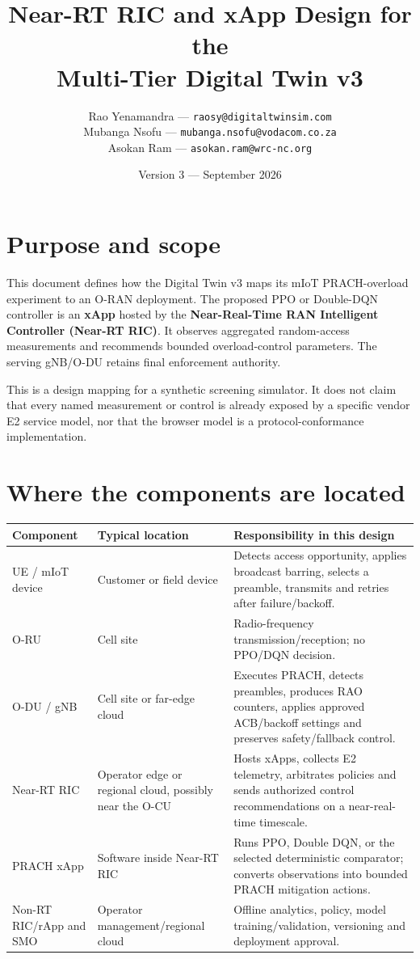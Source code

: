 \documentclass[10pt]{article}
\title{Near-RT RIC and xApp Design for the\\Multi-Tier Digital Twin v3}
\author{Rao Yenamandra --- \texttt{raosy@digitaltwinsim.com}\\
Mubanga Nsofu --- \texttt{mubanga.nsofu@vodacom.co.za}\\
Asokan Ram --- \texttt{asokan.ram@wrc-nc.org}}
\date{Version 3 --- September 2026}
\begin{document}
\maketitle

\section{Purpose and scope}
This document defines how the Digital Twin v3 maps its mIoT PRACH-overload experiment to an O-RAN deployment. The proposed PPO or Double-DQN controller is an \textbf{xApp} hosted by the \textbf{Near-Real-Time RAN Intelligent Controller (Near-RT RIC)}. It observes aggregated random-access measurements and recommends bounded overload-control parameters. The serving gNB/O-DU retains final enforcement authority.

This is a design mapping for a synthetic screening simulator. It does not claim that every named measurement or control is already exposed by a specific vendor E2 service model, nor that the browser model is a protocol-conformance implementation.

\section{Where the components are located}
\begin{tabular}{>{\raggedright\arraybackslash}p{}>{\raggedright\arraybackslash}p{}>{\raggedright\arraybackslash}p{}}
\toprule Component & Typical location & Responsibility in this design\\\midrule
UE / mIoT device & Customer or field device & Detects access opportunity, applies broadcast barring, selects a preamble, transmits and retries after failure/backoff.\\
O-RU & Cell site & Radio-frequency transmission/reception; no PPO/DQN decision.\\
O-DU / gNB & Cell site or far-edge cloud & Executes PRACH, detects preambles, produces RAO counters, applies approved ACB/backoff settings and preserves safety/fallback control.\\
Near-RT RIC & Operator edge or regional cloud, possibly near the O-CU & Hosts xApps, collects E2 telemetry, arbitrates policies and sends authorized control recommendations on a near-real-time timescale.\\
PRACH xApp & Software inside Near-RT RIC & Runs PPO, Double DQN, or the selected deterministic comparator; converts observations into bounded PRACH mitigation actions.\\
Non-RT RIC/rApp and SMO & Operator management/regional cloud & Offline analytics, policy, model training/validation, versioning and deployment approval.\\
\bottomrule\end{tabular}
\end{document}
